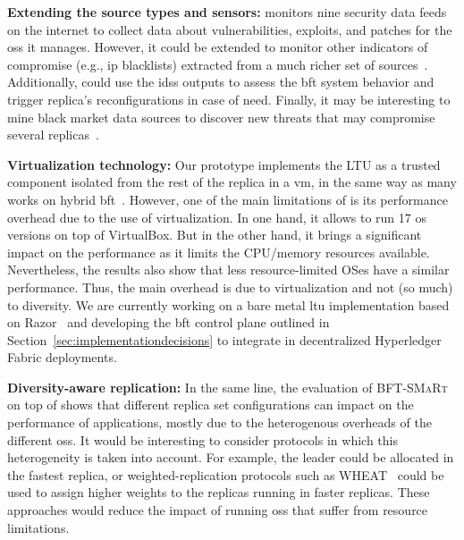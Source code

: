 \textbf{Extending the \system source types and sensors:}
\system monitors nine security data feeds on the internet to collect data about vulnerabilities, exploits, and patches for the \glspl{os} it manages.
However, it could be extended to monitor other indicators of compromise (e.g., \gls{ip} blacklists) extracted from a much richer set of sources~\cite{Liao:2016,Sabottke:2015}.
Additionally, \system could use the \glspl{ids} outputs to assess the \gls{bft} system behavior and trigger replica's reconfigurations in case of need.
Finally, it may be interesting to mine black market data sources to discover new threats that may compromise several replicas~\cite{Allodi:2014}.

\textbf{Virtualization technology:}
Our prototype implements the LTU as a trusted component isolated from the rest of the replica in a \gls{vm}, in the same way as many works on hybrid \gls{bft}~\cite{Veronese:2013,Roeder:2010,Platania:2014,Sousa:2010,Distler:2011}.
However, one of the main limitations of \system is its performance overhead due to the use of virtualization.
In one hand, it allows \system to run 17 \gls{os} versions on top of VirtualBox.
But in the other hand, it brings a significant impact on the performance as it limits the CPU/memory resources available.
Nevertheless, the results also show that less resource-limited OSes have a similar performance.
Thus, the main overhead is due to virtualization and not (so much) to diversity.
We are currently working on a bare metal \gls{ltu} implementation based on Razor~\cite{razor} and developing the \gls{bft} control plane outlined in Section~\ref{sec:implementationdecisions} to integrate \system in decentralized Hyperledger Fabric deployments.



\textbf{Diversity-aware replication:}
In the same line, the evaluation of \textsc{BFT-SMaRt} on top of \system shows that different replica set configurations can impact on the performance of applications, mostly due to the heterogenous overheads of the different \glspl{os}.
It would be interesting to consider protocols in which this heterogeneity is taken into account.
For example, the leader could be allocated in the fastest replica, or weighted-replication protocols such as WHEAT~\cite{Sousa:2015} could be used to assign higher weights to the replicas running in faster replicas.
These approaches would reduce the impact of running \glspl{os} that suffer from resource limitations.


